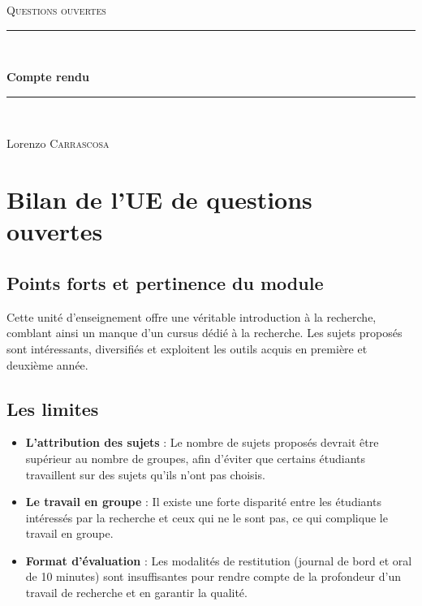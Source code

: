 \documentclass[a4paper,12pt]{article}
\begin{document}
\begin{titlepage}
    \centering
    \vspace*{2cm}

    {\scshape\Large Questions ouvertes \par}
    \vspace{2cm}

    \rule{\linewidth}{0.5mm} \\[0.4cm]
    {\huge\bfseries Compte rendu \par}
    \rule{\linewidth}{0.5mm} \\[1.5cm]

    \vspace{2cm}

    {\Large
    Lorenzo \textsc{Carrascosa} \par}

    \vfill
\end{titlepage}

\clearpage

\section*{Bilan de l'UE de questions ouvertes}

\subsection*{Points forts et pertinence du module}

Cette unité d'enseignement offre une véritable introduction à la recherche, comblant ainsi un manque d'un cursus dédié à la recherche.
Les sujets proposés sont intéressants, diversifiés et exploitent les outils acquis en première et deuxième année.

\subsection*{Les limites}

\begin{itemize}[label=\textbullet]
    \item \textbf{L'attribution des sujets} : Le nombre de sujets proposés devrait être supérieur au nombre de groupes, afin d'éviter que certains étudiants travaillent sur des sujets qu'ils n'ont pas choisis.
    
    \item \textbf{Le travail en groupe} : Il existe une forte disparité entre les étudiants intéressés par la recherche et ceux qui ne le sont pas, ce qui complique le travail en groupe.
    
    \item \textbf{Format d'évaluation} : Les modalités de restitution (journal de bord et oral de 10 minutes) sont insuffisantes pour rendre compte de la profondeur d'un travail de recherche et en garantir la qualité.
\end{itemize}
\end{document}
